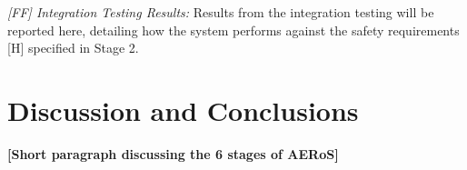 \documentclass[runningheads]{llncs}
\begin{document}

\emph{[FF] Integration Testing Results:} Results from the integration testing will be reported here, detailing how the system performs against the safety requirements [H] specified in Stage 2.


\section{Discussion and Conclusions} \label{discussion-conclusions}
\noindent \textbf{[Short paragraph discussing the 6 stages of AERoS]}
\end{document}
